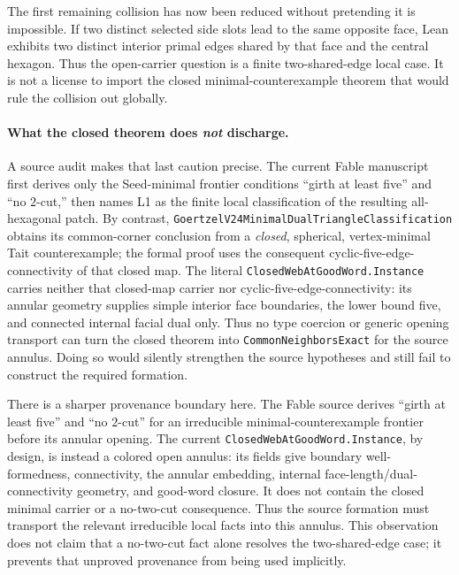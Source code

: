 \documentclass[11pt]{article}
\theoremstyle{definition}
\begin{document}
The first remaining collision has now been reduced without pretending it is
impossible.  If two distinct selected side slots lead to the same opposite
face, Lean exhibits two distinct interior primal edges shared by that face
and the central hexagon.  Thus the open-carrier question is a finite
two-shared-edge local case.  It is not a license to import the closed
minimal-counterexample theorem that
would rule the collision out globally.

\paragraph{What the closed theorem does \emph{not} discharge.}  A source
audit makes that last caution precise.  The current Fable manuscript first
derives only the Seed-minimal frontier conditions ``girth at least five'' and
``no $2$-cut,'' then names L1 as the finite local classification of the
resulting all-hexagonal patch.  By contrast,
\texttt{GoertzelV24MinimalDualTriangleClassification} obtains its
common-corner conclusion from a \emph{closed}, spherical,
vertex-minimal Tait counterexample; the formal proof uses the consequent
cyclic-five-edge-connectivity of that closed map.  The literal
\texttt{ClosedWebAtGoodWord.Instance} carries neither that closed-map carrier
nor cyclic-five-edge-connectivity: its annular geometry supplies simple
interior face boundaries, the lower bound five, and connected internal facial
dual only.  Thus no type coercion or generic opening transport can turn the
closed theorem into \texttt{CommonNeighborsExact} for the source annulus.
Doing so would silently strengthen the source hypotheses and still fail to
construct the required formation.

There is a sharper provenance boundary here.  The Fable source derives
``girth at least five'' and ``no $2$-cut'' for an irreducible
minimal-counterexample frontier before its annular opening.  The current
\texttt{ClosedWebAtGoodWord.Instance}, by design, is instead a colored open
annulus: its fields give boundary well-formedness, connectivity, the annular
embedding, internal face-length/dual-connectivity geometry, and good-word
closure.  It does not contain the closed minimal carrier or a no-two-cut
consequence.  Thus the source formation must transport the relevant
irreducible local facts into this annulus.  This observation does not claim
that a no-two-cut fact alone resolves the two-shared-edge case; it prevents
that unproved provenance from being used implicitly.
\end{document}
